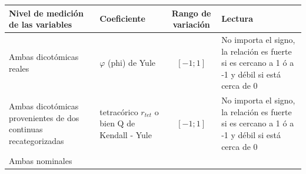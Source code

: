 \documentclass[]{book}
\begin{document}
\begin{longtable}[]{@{}llcl@{}}
\toprule
\begin{minipage}[b]{0.22\columnwidth}\raggedright
Nivel de medición de las variables\strut
\end{minipage} & \begin{minipage}[b]{0.14\columnwidth}\raggedright
Coeficiente\strut
\end{minipage} & \begin{minipage}[b]{0.15\columnwidth}\centering
Rango de variación\strut
\end{minipage} & \begin{minipage}[b]{0.38\columnwidth}\raggedright
Lectura\strut
\end{minipage}\tabularnewline
\midrule
\endhead
\begin{minipage}[t]{0.22\columnwidth}\raggedright
Ambas dicotómicas reales\strut
\end{minipage} & \begin{minipage}[t]{0.14\columnwidth}\raggedright
\(\varphi\) (phi) de Yule\strut
\end{minipage} & \begin{minipage}[t]{0.15\columnwidth}\centering
\([-1; 1]\)\strut
\end{minipage} & \begin{minipage}[t]{0.38\columnwidth}\raggedright
No importa el signo, la relación es fuerte si es cercano a 1 ó a -1 y débil si está cerca de 0\strut
\end{minipage}\tabularnewline
\begin{minipage}[t]{0.22\columnwidth}\raggedright
Ambas dicotómicas provenientes de dos continuas recategorizadas\strut
\end{minipage} & \begin{minipage}[t]{0.14\columnwidth}\raggedright
tetracórico \(r_{tet}\) o bien Q de Kendall - Yule\strut
\end{minipage} & \begin{minipage}[t]{0.15\columnwidth}\centering
\([-1; 1]\)\strut
\end{minipage} & \begin{minipage}[t]{0.38\columnwidth}\raggedright
No importa el signo, la relación es fuerte si es cercano a 1 ó a -1 y débil si está cerca de 0\strut
\end{minipage}\tabularnewline
\begin{minipage}[t]{0.22\columnwidth}\raggedright
Ambas nominales\strut
\end{minipage} & \begin{minipage}[t]{0.14\columnwidth}\raggedright

\end{minipage}
\end{longtable}
\end{document}
